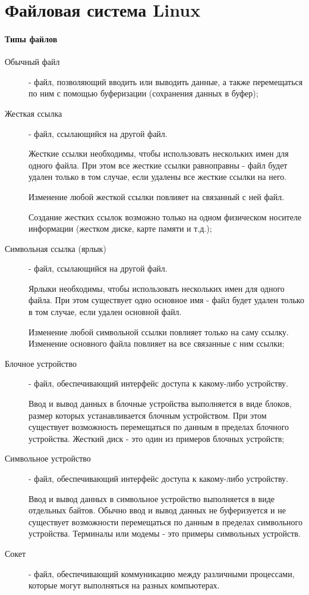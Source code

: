 \hypertarget{appfile}{}
\chapter{Файловая система Linux}

\subsubsection*{Типы файлов}

\begin{description}
  \item[Обычный файл] - файл, позволяющий вводить или выводить данные, а также перемещаться по ним с помощью буферизации (сохранения данных в буфер);

  \item[Жесткая ссылка] - файл, ссылающийся на другой файл. 

  Жесткие ссылки необходимы, чтобы использовать нескольких имен для одного файла. При этом все жесткие ссылки равноправны - файл будет удален только в том случае, если удалены все жесткие ссылки на него. 

  Изменение любой жесткой ссылки повлияет на связанный с ней файл. 

  Создание жестких ссылок возможно только на одном физическом носителе информации (жестком диске, карте памяти и т.д.);

  \item[Символьная ссылка (ярлык)] - файл, ссылающийся на другой файл. 

  Ярлыки необходимы, чтобы использовать нескольких имен для одного файла. При этом существует одно основное имя - файл будет удален только в том случае, если удален основной файл. 

  Изменение любой символьной ссылки повлияет только на саму ссылку. Изменение основного файла повлияет на все связанные с ним ссылки;

  \item[Блочное устройство] - файл, обеспечивающий интерфейс доступа к какому-либо устройству. 

  Ввод и вывод данных в блочные устройства выполняется в виде блоков, размер которых устанавливается блочным устройством. При этом существует возможность перемещаться по данным в пределах блочного устройства. Жесткий диск - это один из примеров блочных устройств;

  \item[Символьное устройство] - файл, обеспечивающий интерфейс доступа к какому-либо устройству. 

  Ввод и вывод данных в символьное устройство выполняется в виде отдельных байтов. Обычно ввод и вывод данных не буферизуется и не существует возможности перемещаться по данным в пределах символьного устройства. Терминалы или модемы - это примеры символьных устройств.

  \item[Сокет] - файл, обеспечивающий коммуникацию между различными процессами, которые могут выполняться на разных компьютерах.
\end{description}

